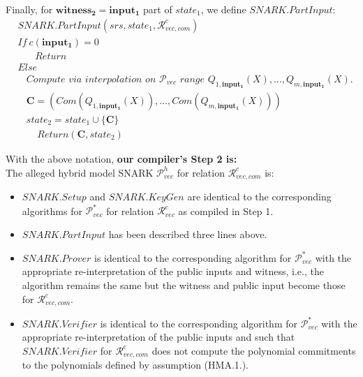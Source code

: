 \noindent Finally, for $\mathbf{witness_2} = \mathbf{input_1}$ part of $\mathit{state_1}$, we define $\mathit{SNARK.PartInput}$:
\begin{align*} 
&\mathit{SNARK.PartInput}(\mathit{srs}, \mathit{state_1},\mathcal{R}_{\mathit{vec}, \mathit{com}}^c) \\  
& \mathit{If \ }  c(\mathbf{input_1}) = 0 \\
& \ \ \ \ \ \ \ \ \mathit{Return} \\
& \mathit{Else} \\
& \ \ \ \ \textit{Compute via interpolation on } \mathscr{P}_{\mathit{vec}}  \textit{ range } 
\mathit{Q_{1,\mathbf{input_1}}}(X), \ldots, \mathit{Q_{m, \mathbf{input_1}}}(X).\\
& \ \ \ \ \mathbf{C} = (\mathit{Com}(Q_{1,\mathbf{input_1}}(X)), \ldots, \mathit{Com}(Q_{m,\mathbf{input_1}}(X))) \\
& \ \ \ \ \mathit{state_2} =  \mathit{state_1} \cup \{ \mathbf{C} \} \\ 
& \ \ \ \ \ \ \ \ \ \mathit{Return} ( \mathbf{C}, \mathit{state_2})
\end{align*}

\noindent With the above notation, \textbf{our compiler's Step 2 is:} \\
\noindent The alleged hybrid model SNARK $\mathscr{P}_{\mathit{vec}}^{h}$ for relation $\mathcal{R}_{\mathit{vec}, \mathit{com}}^c$ is:

\begin{itemize}
\item $\mathit{SNARK.Setup}$ and $\mathit{SNARK.KeyGen}$ are identical to the corresponding algorithms for $\mathscr{P}^*_{\mathit{vec}}$ for 
relation $\mathcal{R}_{\mathit{vec}}^c$ as compiled in Step 1. 
\item $\mathit{SNARK.PartInput}$ has been described three lines above. 
\item $\mathit{SNARK.Prover}$ is identical to the corresponding algorithm for $\mathscr{P}^*_{\mathit{vec}}$ with the appropriate 
re-interpretation of the public inputs and witness, i.e., the algorithm remains the same but the witness and public input 
become those for $\mathcal{R}_{\mathit{vec}, \mathit{com}}^c$.
\item $\mathit{SNARK.Verifier}$ is identical to the corresponding algorithm for $\mathscr{P}^*_{\mathit{vec}}$ with the appropriate 
re-interpretation of the public inputs and such that $\mathit{SNARK.Verifier}$ for $\mathcal{R}_{\mathit{vec}, \mathit{com}}^c$ does
not compute the polynomial commitments to the polynomials defined by assumption (HMA.1.).
\end{itemize}


